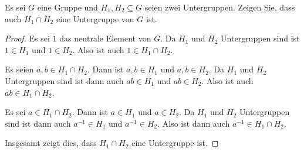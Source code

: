 \begin{question}
 Es sei $G$ eine Gruppe und $H_1, H_2 \subseteq G$ seien zwei Untergruppen. Zeigen Sie, dass auch $H_1 \cap H_2$ eine Untergruppe von $G$ ist.
\end{question}
\begin{proof}
 Es sei $1$ das neutrale Element von $G$. Da $H_1$ und $H_2$ Untergruppen sind ist $1 \in H_1$ und $1 \in H_2$. Also ist auch $1 \in H_1 \cap H_2$.
 
 Es seien $a,b \in H_1 \cap H_2$. Dann ist $a,b \in H_1$ und $a,b \in H_2$. Da $H_1$ und $H_2$ Untergruppen sind ist dann auch $ab \in H_1$ und $ab \in H_2$. Also ist auch $ab \in H_1 \cap H_2$.
 
 Es sei $a \in H_1 \cap H_2$. Dann ist $a \in H_1$ und $a \in H_2$. Da $H_1$ und $H_2$ Untergruppen sind ist dann auch $a^{-1} \in H_1$ und $a^{-1} \in H_2$. Also ist dann auch $a^{-1} \in H_1 \cap H_2$.
 
 Insgesamt zeigt dies, dass $H_1 \cap H_2$ eine Untergruppe ist.
\end{proof}



